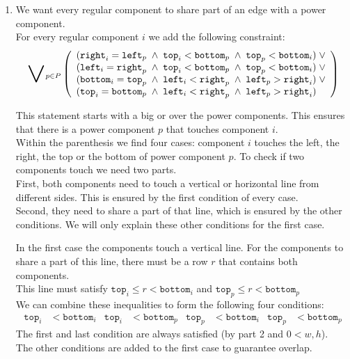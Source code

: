 \documentclass{scrartcl}
\begin{document}
\begin{enumerate}
	\item
	We want every regular component to share part of an edge with a power component.\\
	For every regular component $i$ we add the following constraint:
	\begin{align*}
		\scalerel*{\lor}{\sum}_{p\in P}\left(
		\begin{array}{l}
			(\mathtt{right}_i = \mathtt{left}_p \;\land\; \mathtt{top}_i < \mathtt{bottom}_p \;\land\; \mathtt{top}_p < \mathtt{bottom}_i)\;\lor\\
			(\mathtt{left}_i = \mathtt{right}_p \;\land\; \mathtt{top}_i < \mathtt{bottom}_p \;\land\; \mathtt{top}_p < \mathtt{bottom}_i)\;\lor\\
			(\mathtt{bottom}_i = \mathtt{top}_p \;\land\; \mathtt{left}_i < \mathtt{right}_p \;\land\; \mathtt{left}_p > \mathtt{right}_i)\;\lor\\
			(\mathtt{top}_i = \mathtt{bottom}_p \;\land\; \mathtt{left}_i < \mathtt{right}_p \;\land\; \mathtt{left}_p > \mathtt{right}_i)
		\end{array}
		\right)
	\end{align*}

	This statement starts with a big or over the power components. This ensures that there is a power component $p$ that touches component $i$.\\
	Within the parenthesis we find four cases: component $i$ touches the left, the right, the top or the bottom of power component $p$.
	To check if two components touch we need two parts.\\
	First, both components need to touch a vertical or horizontal line from different sides. This is ensured by the first condition of every case.\\
	Second, they need to share a part of that line, which is ensured by the other conditions.
	We will only explain these other conditions for the first case.

	In the first case the components touch a vertical line.
	For the components to share a part of this line, there must be a row $r$ that contains both components.\\
	This line must satisfy $\mathtt{top}_i \leq r < \mathtt{bottom}_i$ and $\mathtt{top}_p \leq r < \mathtt{bottom}_p$\\
	We can combine these inequalities to form the following four conditions:
	\begin{align*}
		\mathtt{top}_i &< \mathtt{bottom}_i &\mathtt{top}_i &< \mathtt{bottom}_p & \mathtt{top}_p &< \mathtt{bottom}_i &\mathtt{top}_p &< \mathtt{bottom}_p
	\end{align*}
	The first and last condition are always satisfied (by part 2 and $0<w,h$).\\
	The other conditions are added to the first case to guarantee overlap.


\end{enumerate}
\end{document}
